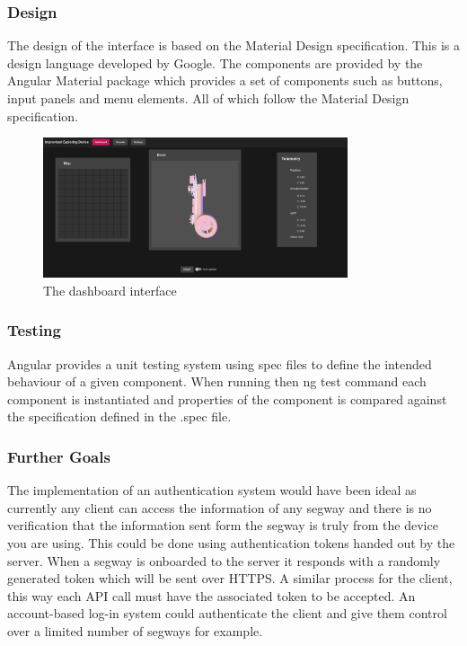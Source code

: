\subsubsection*{Design}
The design of the interface is based on the Material Design specification. This is a design language developed by Google. The components are provided by the Angular Material package which 
provides a set of components such as buttons, input panels and menu elements. All of which follow the Material Design specification.~\cite{ref:angular_material}

\begin{figure}
    \centerline{\includegraphics[width=0.8\textwidth]{images/frontend-demo.png}}
    \caption{The dashboard interface}
\end{figure}

\subsubsection*{Testing}
Angular provides a unit testing system using spec files to define the intended behaviour of a given component. When running then ng test command each component is instantiated and properties of the component is compared against the specification defined in the .spec file.

\subsubsection*{Further Goals}
The implementation of an authentication system would have been ideal 
as currently any client can access the information of any segway and
there is no verification that the information sent form the segway is
truly from the device you are using. This could be done using authentication tokens
handed out by the server. When a segway is onboarded to the server
it responds with a randomly generated token which will be sent 
over HTTPS. A similar process for the client, this way each API
call must have the associated token to be accepted. 
An account-based log-in system could authenticate the client 
and give them control over a limited number of segways for example.